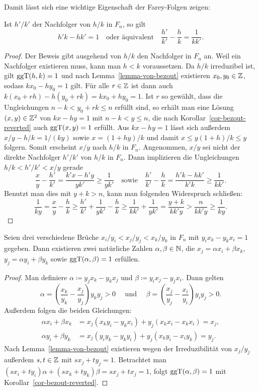 Damit lässt sich eine wichtige Eigenschaft der Farey-Folgen zeigen:
\begin{lemma}\label{lemma-basic-property-farey-successor}
	Ist $h'/k'$ der Nachfolger von $h/k$ in $F_n$, so gilt \[
	h'k - hk' = 1 \text{~~~oder äquivalent~~~} \frac{h'}{k'} - \frac{h}{k} = \frac{1}{kk'}.
	\]
\end{lemma}
\begin{proof}
	Der Beweis gibt ausgehend von $h/k$ den Nachfolger in $F_n$ an.
	Weil ein Nachfolger existieren muss, kann man $h<k$ voraussetzen.
	Da $h/k$ irreduzibel ist, gilt $\operatorname{ggT}(h,k)= 1$ und nach Lemma~\ref{lemma-von-bezout} existieren $x_0, y_0\in\mathbb{Z}$, sodass $kx_0 -hy_0 = 1$ gilt.
	Für alle $r\in\mathbb{Z}$ ist dann auch $k(x_0 + rh) - h(y_0 + rk) = k x_0 + hy_0 = 1$.
	Ist $r$ so gewählt, dass die Ungleichungen $n-k<y_0 +rk \leq n$ erfüllt sind, so erhält man eine Lösung $(x,y)\in\mathbb{Z}^2$ von $kx - hy = 1$ mit $n-k<y\leq n$, die nach Korollar~\ref{cor-bezout-reverted} auch $\operatorname{ggT}(x,y)=1$ erfüllt.
	Aus $kx-hy=1$ lässt sich außerdem $x/y - h/k = 1/(ky)$ sowie $x = (1+hy)/k$ und damit $x \leq y(1+h)/k \leq y$ folgern.
	Somit erscheint $x/y$ nach $h/k$ in $F_n$.
	Angenommen, $x/y$ sei nicht der direkte Nachfolger $h'/k'$ von $h/k$ in $F_n$.
	Dann implizieren die Ungleichungen $h/k < h'/k' < x/y$ gerade \[
	\frac{x}{y} - \frac{h'}{k'} = \frac{k'x-h'y}{yk'} \geq \frac{1}{yk'}\text{~~~sowie~~~} \frac{h'}{k'} - \frac{h}{k} = \frac{h'k - hk'}{k'k} \geq \frac{1}{kk'}. \]
	Benutzt man dies mit $y+k > n$, kann man folgenden Widerspruch schließen:
	\[
		\frac{1}{ky} = \frac{x}{y} - \frac{h}{k} \geq \frac{h'}{k'} + \frac{1}{yk'}- \frac{h}{k} \geq \frac{1}{kk'} + \frac{1}{yk'} = \frac{y+k}{kk'y} > \frac{n}{kk'y} \geq \frac{1}{ky}.
	\]
	\vspace{-0.5em}
\end{proof}

\begin{lemma}\label{lemma-farey-middle-member}
	Seien drei verschiedene Brüche $x_i/y_i < x_j / y_j < x_k / y_k$ in $F_n$  mit $y_i x_k - y_k x_i = 1$ gegeben.
	Dann existieren zwei natürliche Zahlen $\alpha,\beta\in\mathbb{N}$, die $x_j = \alpha x_i + \beta x_k$, $y_j = \alpha y_i + \beta y_k$ sowie $\operatorname{ggT}(\alpha, \beta)=1$ erfüllen.
\end{lemma}
\begin{proof}
	Man definiere $\alpha\coloneq y_j x_k - y_k x_j$ und $\beta\coloneq y_i x_j - y_j x_i$.
	Dann gelten 
	\[
	\alpha = \left(\frac{x_k}{y_k} - \frac{x_j}{y_j}\right) y_k y_j > 0 \text{~~~ und ~~~} \beta = \left( \frac{x_j}{y_j} - \frac{x_i}{y_i} \right) y_i y_j > 0.
	\]
	Außerdem folgen die beiden Gleichungen:
	\begin{align*}
	\alpha x_i + \beta x_k &= x_j(x_k y_i - y_k x_i ) + y_j (x_k x_i - x_k x_i) = x_j, \\[1em]
	\alpha y_i + \beta y_k &= x_j (y_i y_k - y_k y_i) + y_j (x_k y_i - x_i y_k) = y_j.
	\end{align*}
	Nach Lemma~\ref{lemma-von-bezout} existieren wegen der Irreduzibilität von $x_j/y_j$ außerdem $s,t\in\mathbb{Z}$ mit $sx_j + ty_j = 1$.
	Betrachtet man $(sx_i + ty_i)\alpha + (sx_k + ty_k)\beta = s x_j + t x_j = 1$, folgt $\operatorname{ggT}(\alpha, \beta) = 1$ mit Korollar~\ref{cor-bezout-reverted}.
\end{proof}

